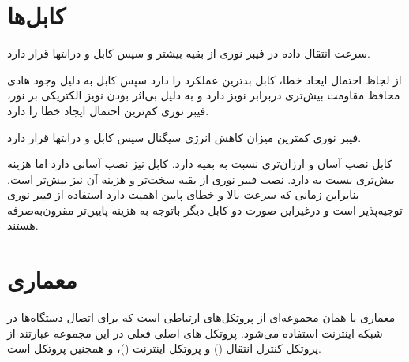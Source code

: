 \documentclass{article}
\begin{document}
\section{کابل‌ها}

سرعت انتقال داده در فیبر نوری از بقیه بیشتر و سپس کابل  و درانتها  قرار دارد.

از لجاظ احتمال ایجاد خطا، کابل  بدترین عملکرد را دارد سپس کابل  به دلیل وجود هادی محافظ مقاومت بیش‌تری دربرابر نویز دارد و به دلیل بی‌اثر بودن نویز الکتریکی بر نور، فیبر نوری کم‌ترین احتمال ایجاد خطا را دارد.

فیبر نوری کمترین میزان کاهش انرژی سیگنال سپس کابل  و درانتها  قرار دارد.

کابل  نصب آسان و ارزان‌تری نسبت به بقیه دارد. کابل  نیز نصب آسانی دارد اما هزینه بیش‌تری نسبت به  دارد. نصب فیبر نوری از بقیه سخت‌تر و هزینه آن نیز بیش‌تر است. بنابراین زمانی که سرعت بالا و خطای پایین اهمیت دارد استفاده از فیبر نوری توجیه‌پذیر است و درغیراین صورت دو کابل دیگر باتوجه به هزینه پایین‌تر مقرون‌به‌صرفه هستند.

\section{معماری }
معماری  یا همان  مجموعه‌ای از پروتکل‌های ارتباطی است که برای اتصال دستگاه‌ها در شبکه اینترنت استفاده می‌شود.
پروتکل های اصلی فعلی در این مجموعه عبارتند از پروتکل کنترل انتقال () و پروتکل اینترنت ()، و همچنین پروتکل  است.
\end{document}
